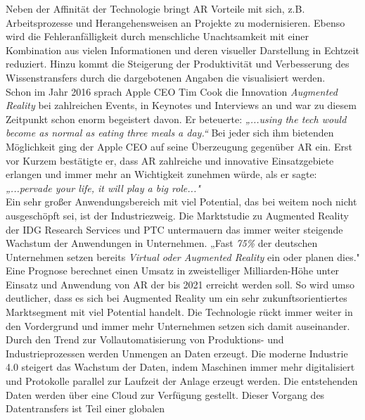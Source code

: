 Neben der Affinität der Technologie bringt \acs{AR} Vorteile mit sich, z.B. Arbeitsprozesse und Herangehensweisen an Projekte zu 
modernisieren. Ebenso wird die Fehleranfälligkeit durch menschliche Unachtsamkeit mit einer Kombination aus vielen Informationen und 
deren visueller Darstellung in Echtzeit reduziert. Hinzu kommt die Steigerung der Produktivität und Verbesserung des Wissenstransfers 
durch die dargebotenen Angaben die visualisiert werden.
\\ 
\linebreak
Schon im Jahr 2016 sprach Apple CEO Tim Cook die Innovation \textit{Augmented Reality} bei zahlreichen Events, in Keynotes und Interviews 
an und war zu diesem Zeitpunkt schon enorm begeistert davon. Er beteuerte: \textit{„...using the tech would become as normal as eating three 
meals a day.“} \cite{timcook2016.2016o} Bei jeder sich ihm bietenden Möglichkeit ging der Apple CEO auf seine Überzeugung gegenüber \acl{AR} ein. 
Erst vor Kurzem bestätigte er, dass \acs{AR} zahlreiche und innovative Einsatzgebiete erlangen und immer mehr an Wichtigkeit zunehmen 
würde, als er sagte: \textit{„...pervade your life, it will play a big role..."} \cite{timcook.2020j} 
\\ 
\linebreak
Ein sehr großer Anwendungsbereich mit viel Potential, das bei weitem noch nicht ausgeschöpft sei, ist der Industriezweig. Die 
Marktstudie zu Augmented Reality der IDG Research Services und PTC untermauern das immer weiter steigende Wachstum der Anwendungen in 
Unternehmen. „Fast \textit{75\%} der deutschen Unternehmen setzen bereits \textit{Virtual oder Augmented Reality} ein oder planen dies." 
\cite{studieptc.2020j} Eine Prognose berechnet einen Umsatz in zweistelliger Milliarden-Höhe unter Einsatz und Anwendung von \acs{AR} der 
bis 2021 erreicht werden soll. So wird umso deutlicher, dass es sich bei Augmented Reality um ein sehr zukunftsorientiertes Marktsegment 
mit viel Potential handelt. Die Technologie rückt immer weiter in den Vordergrund und immer mehr Unternehmen setzen sich damit auseinander.
\\ 
\linebreak
Durch den Trend zur Vollautomatisierung von Produktions- und Industrieprozessen werden Unmengen an Daten erzeugt. Die moderne Industrie 4.0 
steigert das Wachstum der Daten, indem Maschinen immer mehr digitalisiert und Protokolle parallel zur Laufzeit der Anlage erzeugt werden. 
Die entstehenden Daten werden über eine Cloud zur Verfügung gestellt. Dieser Vorgang des Datentransfers ist Teil einer globalen 
